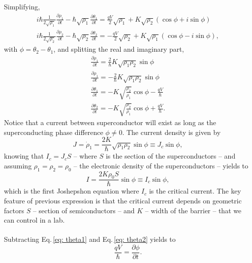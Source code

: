 Simplifying, 
\begin{align}
i\hbar \frac{1}{2\sqrt{\rho_{1}}}\frac{\partial \rho_{1}}{\partial t} - \hbar\sqrt{\rho_{1}}\frac{\partial\theta_{1}}{\partial t} = \frac{qV}{2}\sqrt{\rho_{1}} + K\sqrt{\rho_{2}}\left(\cos{\phi} + i\sin{\phi}\right) \\
i\hbar \frac{1}{2\sqrt{\rho_{2}}}\frac{\partial \rho_{2}}{\partial t} - \hbar\sqrt{\rho_{2}}\frac{\partial\theta_{2}}{\partial t} = -\frac{qV}{2}\sqrt{\rho_{2}} + K\sqrt{\rho_{1}}\left(\cos{\phi} - i\sin{\phi}\right),
\end{align}
with $\phi = \theta_{2} - \theta_{1}$, and splitting the real and imaginary part,
\begin{align}
\frac{\partial \rho_{1}}{\partial t} = \frac{2}{\hbar}K\sqrt{\rho_{1}\rho_{2}}\sin{\phi} \\
\frac{\partial \rho_{1}}{\partial t} = -\frac{2}{\hbar}K\sqrt{\rho_{1}\rho_{2}}\sin{\phi} \\
\label{eq: theta1}
\frac{\partial \theta_{1}}{\partial t} = - K\sqrt{\frac{\rho_{2}}{\rho_{1}}}\cos{\phi}-\frac{qV}{\hbar} \\
\label{eq: theta2}
\frac{\partial \theta_{2}}{\partial t} = - K\sqrt{\frac{\rho_{2}}{\rho_{1}}}\cos{\phi}+\frac{qV}{\hbar}.
\end{align}
Notice that a current between superconductor will exist as long as the superconducting phase difference $\phi \neq 0$.
The current density is given by
\begin{equation}
J = \dot{\rho}_{1} = \frac{2K}{\hbar}\sqrt{\rho_{1}\rho_{2}}\sin{\phi} \equiv J_{c}\sin{\phi},
\end{equation}
knowing that $I_{c} = J_{c}S$ -- where $S$ is the section of the superconductors -- and assuming $\rho_{1} = \rho_{2} =\rho_{0}$ -- the electronic density of the superconductors -- yields to
\begin{equation}
I =\frac{2K\rho_{0}S}{\hbar}\sin{\phi} \equiv I_{c}\sin{\phi},
\end{equation}
which is the first Joshepshon equation where $I_{c}$ is the critical current.
The key feature of previous expression is that the critical current depends on geometric factors $S$ -- section of semiconductors -- and $K$ -- width of the barrier -- that we can control in a lab.\\\\
Subtracting Eq.\,\eqref{eq: theta1} and Eq.\,\eqref{eq: theta2} yields to
\begin{equation}
\frac{qV}{\hbar} = \frac{\partial\phi}{\partial t}.
\end{equation}
